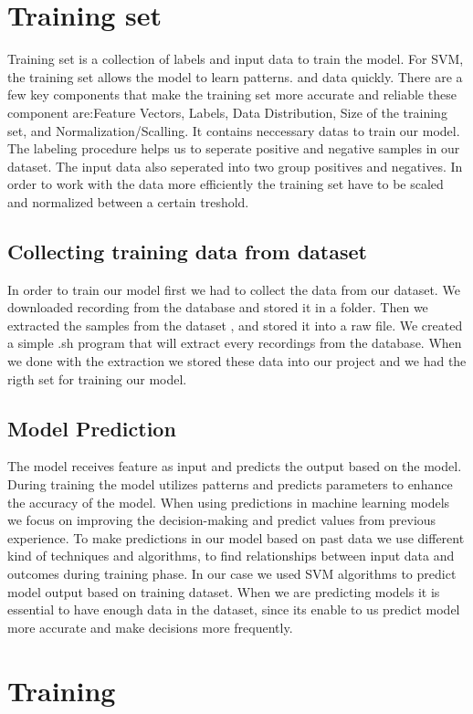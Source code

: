 \documentclass[english,12pt,oneside,a4paper]{article}
\begin{document}
		\section{Training set}
		Training set is a collection of labels and input data to train the model. For SVM, the training set allows the model to learn patterns. and data quickly. There are a few key components that make the training set more accurate and reliable these component are:Feature Vectors, Labels, Data Distribution, Size of the training set, and Normalization/Scalling. It contains neccessary datas to train our model. The labeling procedure helps us to seperate positive and negative samples in our dataset. The input data also seperated into two group positives and negatives. In order to work with the data more efficiently the training set have to be scaled and normalized between a certain treshold.
		\subsection{Collecting training data from dataset}
		In order to train our model first we had to collect the data from our dataset. We downloaded recording from the database and stored it in a folder. Then we extracted the samples from the dataset , and stored it into a raw file. We created a simple .sh program that will extract every recordings from the database. When we done with the extraction we stored these data into our project and we had the rigth set for training our model. 		
		\subsection{Model Prediction}
		The model receives feature as input and predicts the output based on the model. During training the model utilizes patterns and predicts parameters to enhance the accuracy of the model. When using predictions in machine learning models we focus on improving the decision-making and predict values from previous experience.
		To make predictions in our model based on past data we use different kind of techniques and algorithms, to find relationships between input data and outcomes during training phase. In our case we used SVM algorithms to predict model output based on training dataset. When we are predicting models it is essential to have enough data in the dataset, since its enable to us predict model more accurate and make decisions more frequently.
		\section{Training}
		
\end{document}
